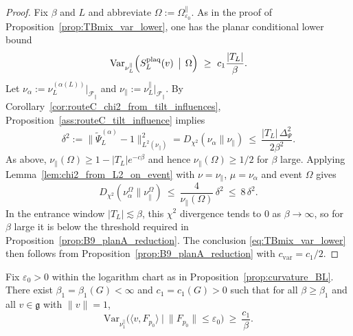 \begin{proof}
Fix $\beta$ and $L$ and abbreviate $\Omega:=\Omega_{\varepsilon_0}^{\parallel}$.
As in the proof of Proposition~\ref{prop:TBmix_var_lower}, one has the planar conditional lower bound
\[
\mathrm{Var}_{\nu_L^{\parallel}}\!\left(S_L^{\mathrm{plaq}}(v)\,\bigm|\,\Omega\right)\ \ge\ c_1\frac{|T_L|}{\beta}.
\]
Let $\nu_{\alpha}:=\nu_L^{(\alpha(L))}|_{\mathscr F_{\parallel}}$ and $\nu_{\parallel}:=\nu_L^{\parallel}|_{\mathscr F_{\parallel}}$.
By Corollary~\ref{cor:routeC_chi2_from_tilt_influences}, Proposition~\ref{ass:routeC_tilt_influence} implies
\[
\delta^2:=\bigl\|\widetilde\Psi_L^{(\alpha)}-1\bigr\|_{L^2(\nu_{\parallel})}^2
=
D_{\chi^2}\!\left(\nu_{\alpha}\Big\|\nu_{\parallel}\right)
\ \le\ \frac{|T_L|\,\Delta_{\Psi}^2}{2\beta^2}.
\]
As above, $\nu_{\parallel}(\Omega)\ge 1-|T_L|e^{-c\beta}$ and hence $\nu_{\parallel}(\Omega)\ge 1/2$ for $\beta$ large.
Applying Lemma~\ref{lem:chi2_from_L2_on_event} with $\nu=\nu_{\parallel}$, $\mu=\nu_{\alpha}$ and event $\Omega$ gives
\[
D_{\chi^2}\!\left(\nu_{\alpha}^{\Omega}\Big\|\nu_{\parallel}^{\Omega}\right)
\ \le\ \frac{4}{\nu_{\parallel}(\Omega)}\,\delta^2
\ \le\ 8\,\delta^2.
\]
In the entrance window $|T_L|\lesssim \beta$, this $\chi^2$ divergence tends to $0$ as $\beta\to\infty$, so for $\beta$ large it is below the threshold required in
Proposition~\ref{prop:B9_planA_reduction}. The conclusion \eqref{eq:TBmix_var_lower} then follows from Proposition~\ref{prop:B9_planA_reduction}
with $c_{\mathrm{var}}=c_1/2$.
\end{proof}



\begin{lemma}\label{lem:planar_one_plaq_var_lower}
Fix $\varepsilon_0>0$ within the logarithm chart as in Proposition~\ref{prop:curvature_BL}.
There exist $\beta_1=\beta_1(G)<\infty$ and $c_1=c_1(G)>0$ such that for all $\beta\ge \beta_1$ and all $v\in\mathfrak g$ with $\|v\|=1$,
\begin{equation}\label{eq:planar_one_plaq_var_lower}
\mathrm{Var}_{\nu_1^{\parallel}}\!\Big(\langle v,F_{p_0}\rangle\ \Big|\ \|F_{p_0}\|\le \varepsilon_0\Big)
\ \ge\ \frac{c_1}{\beta}.
\end{equation}
\end{lemma}

